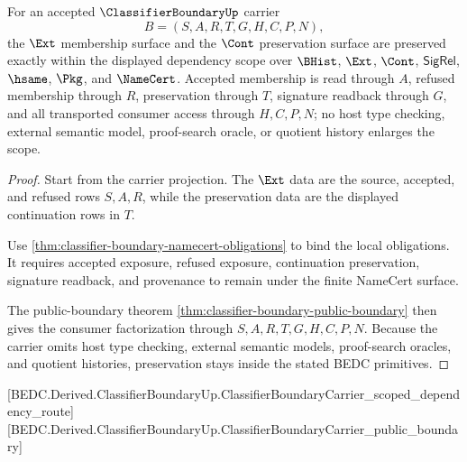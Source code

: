 \begin{theorem}
\label{thm:classifier-boundary-ext-cont-preservation-scope}
For an accepted $\ClassifierBoundaryUp$ carrier
$$
B=(S,A,R,T,G,H,C,P,N),
$$
the $\Ext$ membership surface and the $\Cont$ preservation surface are preserved exactly within the displayed dependency scope over $\BHist$, $\Ext$, $\Cont$, $\mathsf{SigRel}$, $\hsame$, $\Pkg$, and $\NameCert$. Accepted membership is read through $A$, refused membership through $R$, preservation through $T$, signature readback through $G$, and all transported consumer access through $H,C,P,N$; no host type checking, external semantic model, proof-search oracle, or quotient history enlarges the scope.
\end{theorem}
\begin{proof}
Start from the carrier projection. The $\Ext$ data are the source, accepted, and refused rows $S,A,R$, while the preservation data are the displayed continuation rows in $T$.

Use \autoref{thm:classifier-boundary-namecert-obligations} to bind the local obligations. It requires accepted exposure, refused exposure, continuation preservation, signature readback, and provenance to remain under the finite NameCert surface.

The public-boundary theorem \autoref{thm:classifier-boundary-public-boundary} then gives the consumer factorization through $S,A,R,T,G,H,C,P,N$. Because the carrier omits host type checking, external semantic models, proof-search oracles, and quotient histories, preservation stays inside the stated BEDC primitives.
\end{proof}

[BEDC.Derived.ClassifierBoundaryUp.ClassifierBoundaryCarrier_scoped_dependency_route]
[BEDC.Derived.ClassifierBoundaryUp.ClassifierBoundaryCarrier_public_boundary]

